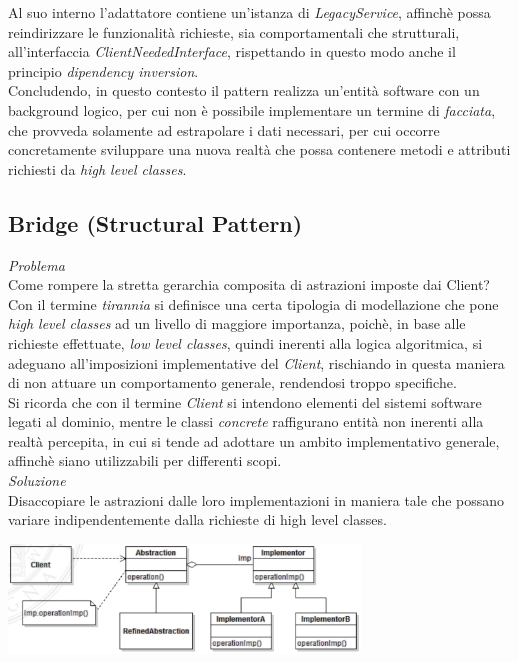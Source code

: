 \documentclass{article}
\begin{document}
Al suo interno l'adattatore contiene un'istanza di \textit{LegacyService}, affinchè possa reindirizzare le funzionalità richieste, sia comportamentali che strutturali, all'interfaccia \textit{ClientNeededInterface}, rispettando in questo modo anche il principio \textit{dipendency inversion}.\vspace*{7pt}\\
Concludendo, in questo contesto il pattern realizza un'entità software con un background logico, per cui non è possibile implementare un termine di \textit{facciata}, che provveda solamente ad estrapolare i dati necessari, per cui occorre concretamente sviluppare una nuova realtà che possa contenere metodi e attributi richiesti da \textit{high level classes}.

\subsection*{Bridge (Structural Pattern)}
\large
\textit{Problema}\\
Come rompere la stretta gerarchia composita di astrazioni imposte dai Client?\vspace*{14pt}\\
Con il termine \textit{tirannia} si definisce una certa tipologia di modellazione che pone \textit{high level classes} ad un livello di maggiore importanza, poichè, in base alle richieste effettuate, \textit{low level classes}, quindi inerenti alla logica algoritmica, si adeguano all'imposizioni implementative del \textit{Client}, rischiando in questa maniera di non attuare un comportamento generale, rendendosi troppo specifiche.\vspace*{7pt}\\
Si ricorda che con il termine \textit{Client} si intendono elementi del sistemi software legati al dominio, mentre le classi \textit{concrete} raffigurano entità non inerenti alla realtà percepita, in cui si tende ad adottare un ambito implementativo generale, affinchè siano utilizzabili per differenti scopi.\vspace*{14pt}\\
\textit{Soluzione}\\
Disaccopiare le astrazioni dalle loro implementazioni in maniera tale che possano variare indipendentemente dalla richieste di high level classes.\vspace*{7pt}
\begin{center}
    \includegraphics[width=0.7\textwidth]{foto 7.png}
\end{center}
\end{document}
